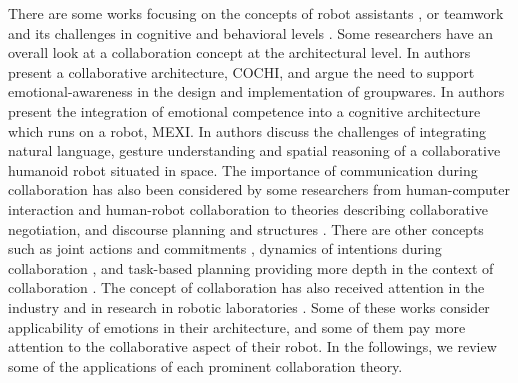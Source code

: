 There are some works focusing on the concepts of robot assistants
\cite{clancey:agent-assistants-collaboration}, or teamwork and its challenges in
cognitive and behavioral levels
\cite{nikolaidis:collaboration-joint-action,scerri:prototype-distributed-teams}.
Some researchers have an overall look at a collaboration concept at the
architectural level. In \cite{garcia:collaboration-emotional-awareness} authors
present a collaborative architecture, COCHI, and argue the need to support
emotional-awareness in the design and implementation of groupwares. In
\cite{esau:integrating-emotion-collaboration} authors present the integration of
emotional competence into a cognitive architecture which runs on a robot, MEXI.
In \cite{sofge:collaboration-humanoid-space} authors discuss the challenges of
integrating natural language, gesture understanding and spatial reasoning of a
collaborative humanoid robot situated in space. The importance of communication
during collaboration has also been considered by some researchers from
human-computer interaction and human-robot collaboration
\cite{clair:action-intention-collaboraiton,matignon:verbal-nonverbal-collaboration,rich:discourse}
to theories describing collaborative negotiation, and discourse planning and
structures
\cite{andriessen:disourse-planning,grosz:discourse-structure,sidner:discourse-collaborative-negotiation}.
There are other concepts such as joint actions and commitments
\cite{grosz:intention-dynamics-collaboration}, dynamics of intentions during
collaboration \cite{levesque:acting-together}, and task-based planning providing
more depth in the context of collaboration
\cite{burghart:cognitive-architecture-robot,rich:cea}. The concept of
collaboration has also received attention in the industry and in research in
robotic laboratories \cite{green:collaboration-literature-review}. Some of these
works consider applicability of emotions in their architecture, and some of them
pay more attention to the collaborative aspect of their robot. In the
followings, we review some of the applications of each prominent collaboration
theory.\\

